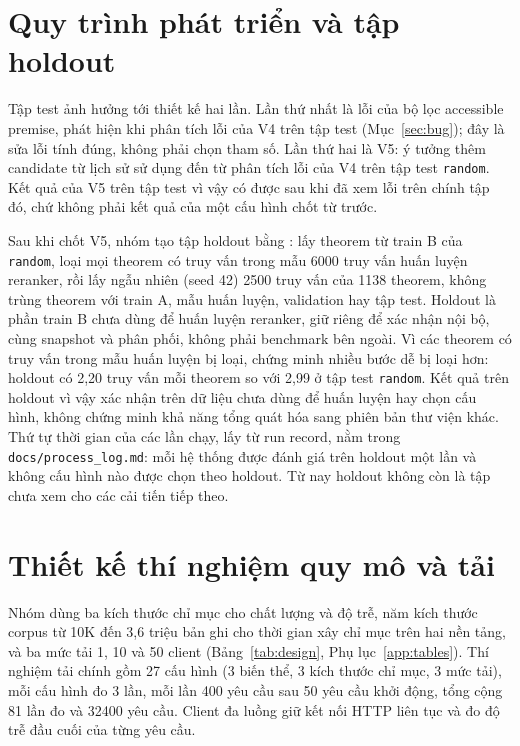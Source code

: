 \documentclass[11pt,a4paper,oneside]{report}
\newcommand{\code}[1]{\texttt{#1}}
\begin{document}
\section{Quy trình phát triển và tập holdout}\label{sec:holdout}

Tập test ảnh hưởng tới thiết kế hai lần. Lần thứ nhất là lỗi của bộ lọc accessible premise, phát hiện khi phân tích lỗi của
V4 trên tập test (Mục~\ref{sec:bug}); đây là sửa lỗi tính đúng, không phải chọn tham số. Lần thứ hai là V5: ý tưởng thêm
candidate từ lịch sử sử dụng đến từ phân tích lỗi của V4 trên tập test \code{random}. Kết quả của V5 trên tập test vì vậy
có được sau khi đã xem lỗi trên chính tập đó, chứ không phải kết quả của một cấu hình chốt từ trước.

Sau khi chốt V5, nhóm tạo tập holdout bằng : lấy theorem từ train B của
\code{random}, loại mọi theorem có truy vấn trong mẫu \num{6000} truy vấn huấn luyện reranker, rồi lấy ngẫu nhiên (seed 42)
\num{2500} truy vấn của \num{1138} theorem, không trùng theorem với train A, mẫu huấn luyện, validation hay tập test. Holdout
là phần train B chưa dùng để huấn luyện reranker, giữ riêng để xác nhận nội bộ, cùng snapshot và phân phối, không phải
benchmark bên ngoài. Vì các
theorem có truy vấn trong mẫu huấn luyện bị loại, chứng minh nhiều bước dễ bị loại hơn: holdout có 2,20 truy vấn mỗi theorem
so với 2,99 ở tập test \code{random}. Kết quả trên holdout vì vậy xác nhận trên dữ liệu chưa dùng để huấn luyện hay chọn
cấu hình, không chứng minh khả năng tổng quát hóa sang phiên bản thư viện khác. Thứ tự thời gian của các lần chạy, lấy từ
run record, nằm trong \code{docs/process\_log.md}: mỗi hệ thống được đánh giá trên holdout một lần và không cấu hình nào
được chọn theo holdout. Từ nay holdout không còn là tập chưa xem cho các cải tiến tiếp theo.

\section{Thiết kế thí nghiệm quy mô và tải}

Nhóm dùng ba kích thước chỉ mục cho chất lượng và độ trễ, năm kích thước corpus từ 10K đến 3,6 triệu bản ghi cho thời
gian xây chỉ mục trên hai nền tảng, và ba mức tải 1, 10 và 50 client (Bảng~\ref{tab:design}, Phụ lục~\ref{app:tables}). Thí
nghiệm tải chính gồm 27 cấu hình (3 biến thể, 3 kích thước chỉ mục, 3 mức tải), mỗi cấu hình đo 3 lần, mỗi lần 400 yêu cầu
sau 50 yêu cầu khởi động, tổng cộng 81 lần đo và \num{32400} yêu cầu. Client đa luồng giữ kết nối HTTP liên tục và đo độ
trễ đầu cuối của từng yêu cầu.
\end{document}
